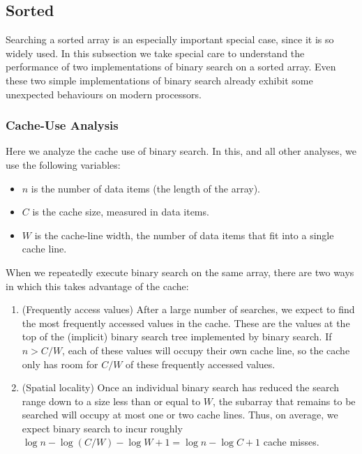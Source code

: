 \documentclass{patmorin}
\begin{document}
\subsection{Sorted}

Searching a sorted array is an especially important special case, since it
is so widely used. In this subsection we take special care to understand
the performance of two implementations of binary search on a sorted array.
Even these two simple implementations of binary search already exhibit
some unexpected behaviours on modern processors.

\subsubsection{Cache-Use Analysis}

Here we analyze the cache use of binary search. In this, and all other
analyses, we use the following variables:

\begin{itemize}
  \item $n$ is the number of data items (the length of the array).
  \item $C$ is the cache size, measured in data items.
  \item $W$ is the cache-line width, the number of data items that fit
        into a single cache line.
\end{itemize}

When we repeatedly execute binary search on the same array, there are
two ways in which this takes advantage of the cache:

\begin{enumerate}
  \item (Frequently access values) After a large number of searches,
    we expect to find the most frequently accessed values in the cache.
    These are the values at the top of the (implicit) binary search tree
    implemented by binary search.  If $n>C/W$, each of these values will
    occupy their own cache line, so the cache only has room for $C/W$
    of these frequently accessed values.
  \item (Spatial locality) Once an individual binary search has reduced
    the search range down to a size less than or equal to $W$, the
    subarray that remains to be searched will occupy at most one or two
    cache lines. Thus, on average, we expect binary search to incur
    roughly $\log n -\log(C/W) - \log W + 1 = \log n - \log C + 1$
    cache misses.
\end{enumerate}
\end{document}

